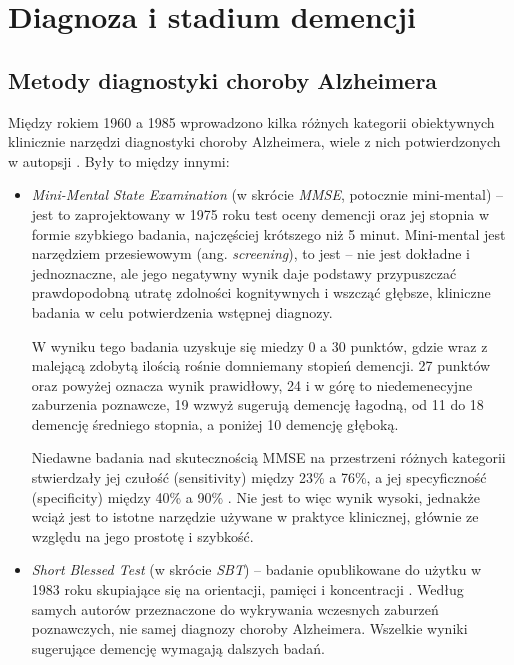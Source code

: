 \section{Diagnoza i stadium demencji}


\subsection{Metody diagnostyki choroby Alzheimera}

Między rokiem 1960 a 1985 wprowadzono kilka różnych kategorii obiektywnych klinicznie narzędzi diagnostyki choroby Alzheimera, wiele z nich potwierdzonych w autopsji \cite{khachaturian2006diagnosis}.
Były to między innymi:

\begin{itemize}

  \item \emph{Mini-Mental State Examination} (w skrócie \emph{MMSE}, potocznie mini-mental) -- jest to zaprojektowany w 1975 roku test oceny demencji oraz jej stopnia w formie szybkiego badania, najczęściej krótszego niż 5 minut.
        Mini-mental jest narzędziem przesiewowym (ang. \emph{screening}), to jest -- nie jest dokładne i jednoznaczne, ale jego negatywny wynik daje podstawy przypuszczać prawdopodobną utratę zdolności kognitywnych i wszcząć
        głębsze, kliniczne badania w celu potwierdzenia wstępnej diagnozy.

        W wyniku tego badania uzyskuje się miedzy 0 a 30 punktów, gdzie wraz z malejącą zdobytą ilością rośnie domniemany stopień demencji.
        27 punktów oraz powyżej oznacza wynik prawidłowy, 24 i w górę to niedemenecyjne zaburzenia poznawcze, 19 wzwyż sugerują demencję łagodną, od 11 do 18 demencję średniego stopnia, a poniżej 10 demencję głęboką.

        Niedawne badania nad skutecznością MMSE na przestrzeni różnych kategorii stwierdzały jej czułość (sensitivity) między 23\% a 76\%, a jej specyficzność (specificity) między 40\% a 90\% \cite{arevalo2015mini}.
        Nie jest to więc wynik wysoki, jednakże wciąż jest to istotne narzędzie używane w praktyce klinicznej, głównie ze względu na jego prostotę i szybkość.

  \item \emph{Short Blessed Test} (w skrócie \emph{SBT}) -- badanie opublikowane do użytku w 1983 roku skupiające się na orientacji, pamięci i koncentracji \cite{katzman1983validation}.
        Według samych autorów przeznaczone do wykrywania wczesnych zaburzeń poznawczych, nie samej diagnozy choroby Alzheimera.
        Wszelkie wyniki sugerujące demencję wymagają dalszych badań.


\end{itemize}
